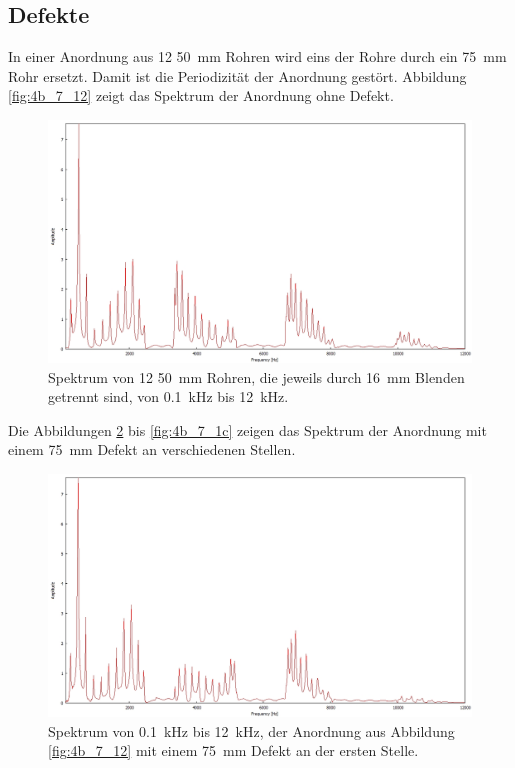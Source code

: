 \subsection{Defekte}
In einer Anordnung aus 12 50~mm Rohren wird eins der Rohre durch ein 75~mm Rohr ersetzt. 
Damit ist die Periodizität der Anordnung gestört.
Abbildung \ref{fig:4b_7_12} zeigt das Spektrum der Anordnung ohne Defekt.
\begin{figure}
\centering
\includegraphics[width=\textwidth]{content/messungen/Chapter4b/4b_7_12x50.jpg}
\caption{Spektrum von 12 50~mm Rohren, die jeweils durch 16~mm Blenden getrennt sind, von 0.1~kHz bis 12~kHz.}
\label{fig:4b_7}
\end{figure}
Die Abbildungen \ref{fig:4b_7_1a} bis \ref{fig:4b_7_1c} zeigen das Spektrum der Anordnung mit einem 75~mm Defekt an verschiedenen Stellen.
\begin{figure}
\centering
\includegraphics[width=\textwidth]{content/messungen/Chapter4b/4b_7_1a.jpg}
\caption{Spektrum von 0.1~kHz bis 12~kHz, der Anordnung aus Abbildung \ref{fig:4b_7_12} mit einem 75~mm Defekt an der ersten Stelle.}
\label{fig:4b_7_1a}
\end{figure}
